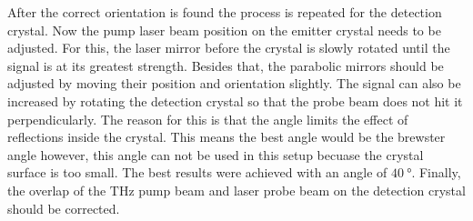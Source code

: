 After the correct orientation is found the process is repeated for the detection crystal.
Now the pump laser beam position on the emitter crystal needs to be adjusted.
For this, the laser mirror before the crystal is slowly rotated until the signal is at its greatest strength.
Besides that, the parabolic mirrors should be adjusted by moving their position and orientation slightly.
The signal can also be increased by rotating the detection crystal so that the probe beam does not hit it perpendicularly.
The reason for this is that the angle limits the effect of reflections inside the crystal.
This means the best angle would be the brewster angle however, this angle can not be used in this setup becuase the crystal surface is too small. 
The best results were achieved with an angle of $\SI{40}{\degree}$.
Finally, the overlap of the $\si{\tera\hertz}$ pump beam and laser probe beam on the detection crystal should be corrected.


\FloatBarrier
